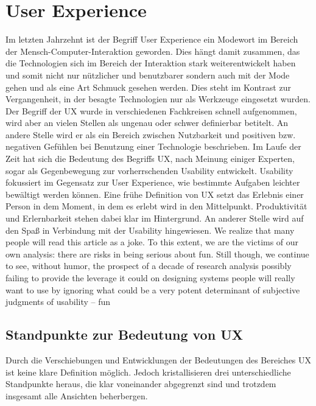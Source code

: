 \chapter{User Experience} 
Im letzten Jahrzehnt ist der Begriff User Experience ein Modewort im Bereich der Mensch-Computer-Interaktion geworden. Dies hängt damit zusammen, das die Technologien sich im Bereich der Interaktion stark weiterentwickelt haben und somit nicht nur nützlicher und benutzbarer sondern auch mit der Mode gehen und als eine Art Schmuck gesehen werden. Dies steht im Kontrast zur Vergangenheit, in der besagte Technologien nur als Werkzeuge eingesetzt wurden.\\
Der Begriff der UX wurde in verschiedenen Fachkreisen schnell aufgenommen, wird aber an vielen Stellen als ungenau oder schwer definierbar betitelt. 
An andere Stelle wird er als ein Bereich zwischen Nutzbarkeit und positiven bzw. negativen Gefühlen bei Benutzung einer Technologie beschrieben. 
\cite{Forlizzi:2004dz}
Im Laufe der Zeit hat sich die Bedeutung des Begriffs UX, nach Meinung einiger Experten, sogar als Gegenbewegung zur vorherrschenden Usability entwickelt. Usability fokussiert im Gegensatz zur User Experience, wie bestimmte Aufgaben leichter bewältigt werden können.
Eine frühe Definition von UX setzt das Erlebnis einer Person in dem Moment, in dem es erlebt wird in den Mittelpunkt. Produktivität und Erlernbarkeit stehen dabei klar im Hintergrund.\cite{Whiteside:fe}
An anderer Stelle wird auf den Spaß in Verbindung mit der Usability hingewiesen.
\glqq We realize that many people will read this article as a joke. To this extent, we are the victims of our own
analysis: there are risks in being serious about fun. Still though, we continue to see, without humor, the prospect of a decade of research analysis possibly failing to provide the leverage it could on designing systems people will really want to use by ignoring what could be a very potent determinant of subjective judgments of usability – fun\grqq\
\cite{Carroll:1988hi}


\section{Standpunkte zur Bedeutung von UX} 
Durch die Verschiebungen und Entwicklungen der Bedeutungen des Bereiches UX ist keine klare Definition möglich. Jedoch kristallisieren drei unterschiedliche Standpunkte heraus, die klar voneinander abgegrenzt sind und trotzdem insgesamt alle Ansichten beherbergen.  


